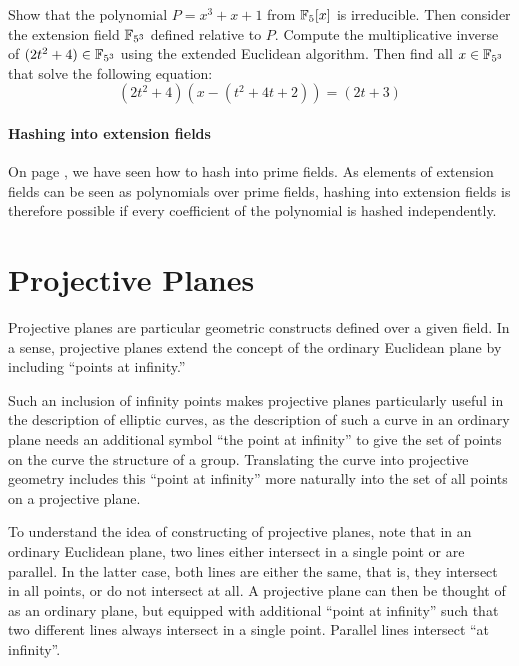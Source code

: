 \begin{exercise} Show that the polynomial $P=x^3+x+1$ from $\mathbb{F}_5[x]$ is irreducible. Then consider the extension field $\mathbb{F}_{5^3}$ defined relative to $P$. Compute the multiplicative inverse of $(2t^2+4)\in\mathbb{F}_{5^3}$ using the extended Euclidean algorithm. Then find all $x\in\mathbb{F}_{5^3}$ that solve the following equation:
\begin{equation}
(2t^2+4)(x-(t^2+4t+2))= (2t+3)
\end{equation}
\end{exercise}

\paragraph{Hashing into extension fields} On page \pageref{hashing-prime-fields}, we have seen how to hash into prime fields. As elements of extension fields can be seen as polynomials over prime fields, hashing into extension fields is therefore possible if every coefficient of the polynomial is hashed independently.
\section{Projective Planes}\label{sec:planes}
Projective planes are particular geometric constructs defined over a given field. In a sense, projective planes extend the concept of the ordinary Euclidean plane by including ``points at infinity.''

Such an inclusion of infinity points makes projective planes particularly useful in the description of elliptic curves, as the description of such a curve in an ordinary plane needs an additional symbol ``the point at infinity'' to give the set of points on the curve the structure of a group. Translating the curve into projective geometry includes this ``point at infinity'' more naturally into the set of all points on a projective plane.

To understand the idea of constructing of projective planes, note that in
an ordinary Euclidean plane, two lines either intersect in a single point or are parallel. In the latter case, both lines are either the same, that is, they intersect in all points, or do not intersect at all. A projective plane can then be thought of as an ordinary plane, but equipped with additional ``point at infinity'' such that two different lines always intersect in a single point. Parallel lines intersect ``at infinity''.

